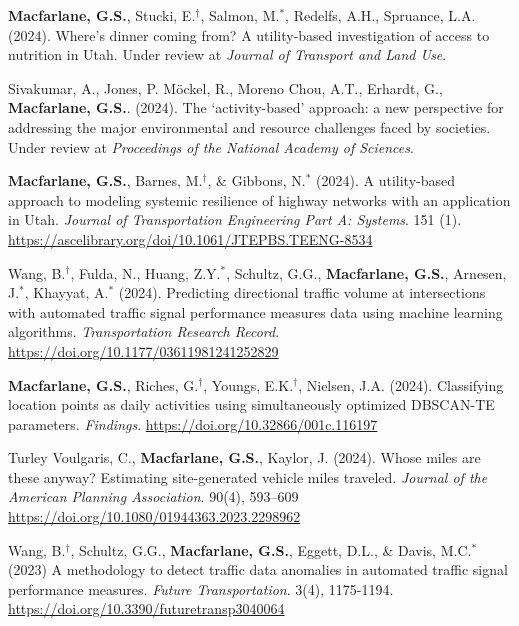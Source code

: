 \documentclass[margin,line]{res}
\newif\ifdetail
\newcounter{enuminitialize}
\newenvironment{myenum}[1][]
{%
 \setcounter{enuminitialize}{#1}
 \addtocounter{enuminitialize}{2}
 \begin{enumerate}[left= 4pt, itemsep=8pt, start=\value{enuminitialize}, label=\arabic*\addtocounter{enumi}{-2}]
}
{%
 \end{enumerate}
}
\begin{document}
\begin{resume}
\begin{myenum}[26]
{  \item \textbf{Macfarlane, G.S.}, Stucki, E.$^\dagger$, Salmon, M.$^*$, Redelfs, A.H.,
  Spruance, L.A. (2024). Where’s dinner coming from? A utility-based
  investigation of access to nutrition in Utah. Under review at \textit{Journal of Transport and Land Use}.

  \item Sivakumar, A., Jones, P. M\"ockel, R., Moreno Chou, A.T., Erhardt, G.,
  \textbf{Macfarlane, G.S.}. (2024). The ‘activity-based’ approach: a new
  perspective for addressing the major environmental and resource challenges
  faced by societies. Under review at \textit{Proceedings of the National Academy of Sciences}. 

  \item \textbf{Macfarlane, G.S.}, Barnes, M.$^\dagger$, \& Gibbons, N.$^*$ (2024). 
  A utility-based approach to modeling systemic resilience of highway networks with an application in Utah.
  \textit{Journal of Transportation Engineering Part A: Systems}. 151 (1). \url{https://ascelibrary.org/doi/10.1061/JTEPBS.TEENG-8534}

  \item Wang, B.$^\dagger$, Fulda, N., Huang, Z.Y.$^*$, Schultz, G.G., \textbf{Macfarlane, G.S.}, Arnesen, J.$^*$, Khayyat, A.$^*$ (2024). 
  Predicting directional traffic volume at intersections with automated traffic signal performance measures data using machine learning algorithms.
 \textit{Transportation Research Record}. \url{https://doi.org/10.1177/03611981241252829}

  \item \textbf{Macfarlane, G.S.}, Riches, G.$^\dagger$, Youngs, E.K.$^\dagger$,
  Nielsen, J.A. (2024). Classifying location points as daily activities using
  simultaneously optimized DBSCAN-TE parameters.  \textit{Findings}.
  \url{https://doi.org/10.32866/001c.116197}

  \item Turley Voulgaris, C., \textbf{Macfarlane, G.S.}, Kaylor, J. (2024).
  Whose miles are these anyway? Estimating site-generated vehicle miles traveled.
  \textit{Journal of the American Planning Association}. 90(4), 593--609 \url{https://doi.org/10.1080/01944363.2023.2298962}

  \item  Wang, B.$^\dagger$, Schultz, G.G., \textbf{Macfarlane, G.S.}, Eggett, D.L., 
  \& Davis, M.C.$^*$ (2023) A methodology to detect traffic data anomalies in automated traffic 
  signal performance measures. \textit{Future Transportation}. 3(4), 1175-1194. \url{https://doi.org/10.3390/futuretransp3040064} 
  \ifdetail Citations: 2 \fi

}
\end{myenum}
\end{resume}
\end{document}
